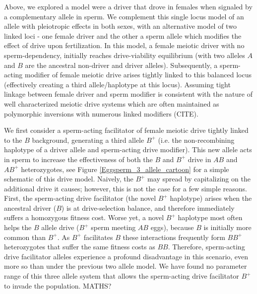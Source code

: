 \documentclass[12pt,letterpaper]{article}
\newcommand{\yb}[1]{{ \color{blue} #1}}
\begin{document}

Above, we explored a model were a driver that drove in females when signaled by a complementary allele in sperm.  
We complement this single locus model of an allele with pleiotropic effects in both sexes, 
 with  an alternative model of two linked loci - one female driver and the other a sperm allele which modifies the effect of drive upon fertilization. 
In this model, a female meiotic driver with no sperm-dependency, initially reaches drive-viability equilibrium (with two alleles
$A$ and $B$ are the ancestral non-driver and driver alleles).
Subsequently, a sperm-acting modifier of female meiotic drive arises tightly
        linked to this balanced locus (effectively creating a third
        allele/haplotype at this locus).
Assuming tight linkage between female driver and sperm modifier is consistent with the nature of well characterized meiotic drive systems 
	which are often maintained as polymorphic inversions with numerous linked modifiers (CITE).



We first consider a sperm-acting facilitator of
	female meiotic drive tightly linked to the $B$ background, 
	generating a third allele $B^{+}$ (i.e. the non-recombining haplotype of a
        driver allele and sperm-acting drive modifier). 
This new allele acts in sperm to increase the effectiveness of both
	the $B$ and  $B^{+}$ drive in $AB$ and $AB^{+}$ heterozygotes, see Figure \ref{Eggsperm_3_allele_cartoon} 
	for a simple schematic of this drive model.  
Naively, the $B^{+}$ may spread by capitalizing on the additional drive it causes; however,  
	this is not the case for a few simple reasons. 
First, the sperm-acting drive facilitator (the novel $B^{+}$ haplotype) 
	arises when the ancestral driver ($B$) is at drive-selection balance, 
	and therefore immediately suffers a homozygous fitness cost.  
Worse yet, a novel $B^{+}$ haplotype most often helps 
	the $B$  allele drive ($B^+$ sperm meeting $AB$ eggs), because $B$ is initially more common than $B^{+}$. 
As $B^{+}$ facilitates $B$ these interactions frequently form 
	$BB^{+}$ heterozygotes that suffer the same fitness costs as $BB$. 
Therefore, sperm-acting drive facilitator alleles experience a profound disadvantage 
	in this scenario, even more so than under the previous two allele model. 
We have found no parameter range of this
	three allele system that allows the sperm-acting drive facilitator $B^{+}$ to
	invade the population. \yb{MATHS?}
\end{document}
